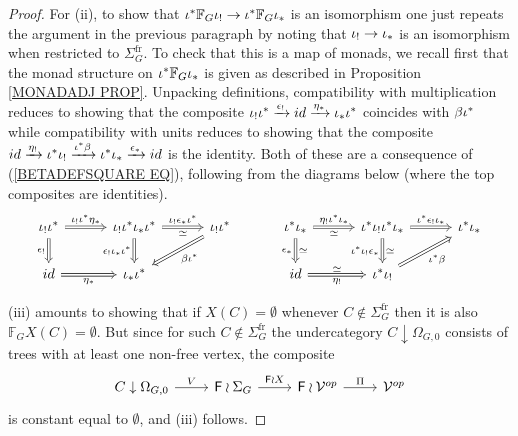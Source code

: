 \documentclass[a4paper,10pt]{article}%
\begin{document}
\begin{proof}
For (ii), to show that 
	$\iota^{\**} \mathbb{F}_G \iota_{!}
	\to	
	\iota^{\**} \mathbb{F}_G \iota_{\**}$ is an isomorphism one just repeats the argument in the previous paragraph by noting  that $\iota_! \to \iota_{\**}$ is an isomorphism when restricted to $\Sigma_G^{\text{fr}}$.
	To check that this is a map of monads, we recall first that the monad structure on $\iota^{\**} \mathbb{F}_G \iota_{\**}$
is given as described in Proposition \ref{MONADADJ PROP}.
Unpacking definitions, compatibility with multiplication reduces to showing that the composite 
$\iota_! \iota^{\**} \xrightarrow{\epsilon_!} 
id \xrightarrow{\eta_{\**}} \iota_{\**} \iota^{\**}$
coincides with $\beta \iota^{\**}$
while compatibility with units 
reduces to showing that the composite
$
	id \xrightarrow{\eta_!} 
	\iota^{\**} \iota_! \xrightarrow{\iota^{\**} \beta}
	\iota^{\**} \iota_{\**} \xrightarrow{\epsilon_{\**}}
	id
$
is the identity. Both of these are a consequence of 
(\ref{BETADEFSQUARE EQ}), following from the diagrams below 
(where the top composites are identities).
\begin{equation}
\begin{tikzcd}[column sep =3em]
		\iota_! \iota^{\**}
		\ar[Rightarrow]{r}{\iota_! \iota^{\**} \eta_{\**}}
		\ar[Rightarrow]{d}[swap]{\epsilon_!}
	&
		\iota_{!} \iota^{\**} \iota_{\**} \iota^{\**}
		\ar[Rightarrow]{d}[swap]{ \epsilon_! \iota_{\**}\iota^{\**}}
		\ar[Rightarrow]{r}[swap]{\simeq}{\iota_{!}\epsilon_{\**}\iota^{\**}}
	&
		\iota_! \iota^{\**}
		\ar[Rightarrow]{ld}{\beta \iota^{\**}}
	&	
		\iota^{\**} \iota_{\**}
		\ar[Rightarrow]{r}{\eta_! \iota^{\**} \iota_{\**}}[swap]{\simeq}
		\ar[Rightarrow]{d}[swap]{\epsilon_{\**}}{\simeq}
	&
		\iota^{\**} \iota_{!} \iota^{\**} \iota_{\**}
		\ar[Rightarrow]{r}{\iota^{\**} \epsilon_! \iota_{\**}}
		\ar[Rightarrow]{d}{\simeq}[swap]{\iota^{\**}\iota_{!}\epsilon_{\**}}
	&
		\iota^{\**}\iota_{\**}
\\
		id
		\ar[Rightarrow]{r}[swap]{\eta_{\**}}
	&
		\iota_{\**} \iota^{\**}
	&
	&	
		id
		\ar[Rightarrow]{r}[swap]{\eta_!}{\simeq}
	&
		\iota^{\**} \iota_!
		\ar[Rightarrow]{ru}[swap]{\iota^{\**} \beta}
\end{tikzcd}
\end{equation}

(iii) amounts to showing that if $X(C) =\emptyset$ whenever 
$C \nin \Sigma_G^{\text{fr}}$
then it is also 
$\mathbb{F}_G X(C) =\emptyset$.
But since for such 
$C \nin \Sigma_G^{\text{fr}}$
the undercategory
$C \downarrow \Omega_{G,0}$
consists of trees with at least one non-free vertex, the composite
\[
\begin{tikzcd}
	C \downarrow \Omega_{G,0} \ar{r}{V} &
	\Fin \wr \Sigma_G \ar{r}{\Fin \wr X} &
	\Fin \wr \mathcal{V}^{op} \ar{r}{\Pi}&
	\mathcal{V}^{op}
\end{tikzcd}
\]
is constant equal to $\emptyset$, and (iii) follows.



\end{proof}
\end{document}

